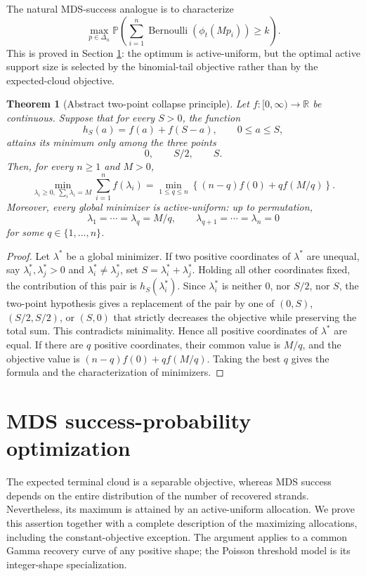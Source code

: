 \documentclass[11pt]{article}
\newtheorem{theorem}{Theorem}
\theoremstyle{definition}
\theoremstyle{remark}
\DeclareMathOperator{\Bernoulli}{Bernoulli}
\newcommand{\Pbb}{\mathbb P}
\newcommand{\1}{\mathbf 1}
\begin{document}
The natural MDS-success analogue is to characterize
\[
  \max_{p\in\Delta_n}\Pbb\left(\sum_{i=1}^n \Bernoulli(\phi_t(Mp_i))\ge k\right).
\]
This is proved in Section \ref{sec:mds-success-modules}: the optimum is active-uniform, but the optimal active support size is selected by the binomial-tail objective rather than by the expected-cloud objective.

\newpage
\begin{theorem}[Abstract two-point collapse principle]
\label{thm:abstract-two-point-collapse}
Let $f:[0,\infty)\to\mathbb R$ be continuous.  Suppose that for every $S>0$, the function
\[
  h_S(a)=f(a)+f(S-a),\qquad 0\le a\le S,
\]
attains its minimum only among the three points
\[
  0,\qquad S/2,\qquad S.
\]
Then, for every $n\ge1$ and $M>0$,
\[
  \min_{\lambda_i\ge0,\ \sum_i\lambda_i=M}\sum_{i=1}^n f(\lambda_i)
  =\min_{1\le q\le n}\left\{(n-q)f(0)+qf(M/q)\right\}.
\]
Moreover, every global minimizer is active-uniform: up to permutation,
\[
  \lambda_1=\cdots=\lambda_q=M/q,
  \qquad
  \lambda_{q+1}=\cdots=\lambda_n=0
\]
for some $q\in\{1,\ldots,n\}$.
\end{theorem}

\begin{proof}
Let $\lambda^*$ be a global minimizer.  If two positive coordinates of $\lambda^*$ are unequal, say $\lambda_i^*,\lambda_j^*>0$ and $\lambda_i^*\ne\lambda_j^*$, set $S=\lambda_i^*+\lambda_j^*$.  Holding all other coordinates fixed, the contribution of this pair is $h_S(\lambda_i^*)$.  Since $\lambda_i^*$ is neither $0$, nor $S/2$, nor $S$, the two-point hypothesis gives a replacement of the pair by one of $(0,S)$, $(S/2,S/2)$, or $(S,0)$ that strictly decreases the objective while preserving the total sum.  This contradicts minimality.  Hence all positive coordinates of $\lambda^*$ are equal.  If there are $q$ positive coordinates, their common value is $M/q$, and the objective value is $(n-q)f(0)+qf(M/q)$.  Taking the best $q$ gives the formula and the characterization of minimizers.
\end{proof}

\section{MDS success-probability optimization}
\label{sec:mds-success-modules}

The expected terminal cloud is a separable objective, whereas MDS success depends on the entire distribution of the number of recovered strands. Nevertheless, its maximum is attained by an active-uniform allocation. We prove this assertion together with a complete description of the maximizing allocations, including the constant-objective exception. The argument applies to a common Gamma recovery curve of any positive shape; the Poisson threshold model is its integer-shape specialization.
\end{document}
